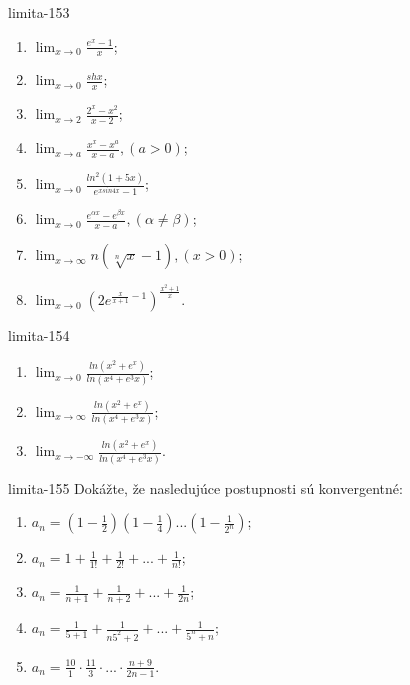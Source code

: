 \begin{defproblem}{limita-153}
\begin{multicols}{2}
\begin{enumerate}
    \item $\lim_{{x \rightarrow 0}} \frac{e^x-1}{x}$;
    \item $\lim_{{x \rightarrow 0}} \frac{sh x}{x}$;
    \item $\lim_{{x \rightarrow 2}} \frac{2^x-x^2}{x-2}$;
    \item $\lim_{{x \rightarrow a}} \frac{x^x-x^a}{x-a},(a>0)$;
    \item $\lim_{{x \rightarrow 0}} \frac{ln^2 (1+5x)}{e^{x sin 4x}-1}$;
    \item $\lim_{{x \rightarrow 0}} \frac{e^{\alpha x}-e^{\beta x}}{x-a},(\alpha \neq \beta)$;
    \item $\lim_{{x \rightarrow \infty}}n(\sqrt[n]{x}-1),(x>0)$;
    \item $\lim_{{x \rightarrow 0}} ({2e^{\frac{x}{x+1}-1}})^{\frac{x^2+1}{x}}$.
\end{enumerate}
\end{multicols}
\end{defproblem}

\begin{defproblem}{limita-154}
\begin{multicols}{2}
\begin{enumerate}
    \item $\lim_{{x \rightarrow 0}} \frac{ln(x^2+e^x)}{ln(x^4+e^3x)}$;
    \item $\lim_{{x \rightarrow \infty}} \frac{ln(x^2+e^x)}{ln(x^4+e^3x)}$;
    \item $\lim_{{x \rightarrow -\infty}} \frac{ln(x^2+e^x)}{ln(x^4+e^3x)}$.
\end{enumerate}
\end{multicols}
\end{defproblem}

\begin{defproblem}{limita-155}
Dokážte, že nasledujúce postupnosti sú konvergentné:
\begin{enumerate}
\item $a_n=(1-\frac{1}{2})(1-\frac{1}{4})...(1-\frac{1}{2^n})$;
\item $a_n=1+\frac{1}{1!}+\frac{1}{2!}+...+\frac{1}{n!}$;
\item $a_n=\frac{1}{n+1}+\frac{1}{n+2}+...+\frac{1}{2n}$;
\item $a_n=\frac{1}{5+1}+\frac{1}{n5^2+2}+...+\frac{1}{5^n+n}$;
\item $a_n=\frac{10}{1}\cdot \frac{11}{3}\cdot ...\cdot \frac{n+9}{2n-1}$.
\end{enumerate}
\end{defproblem}

